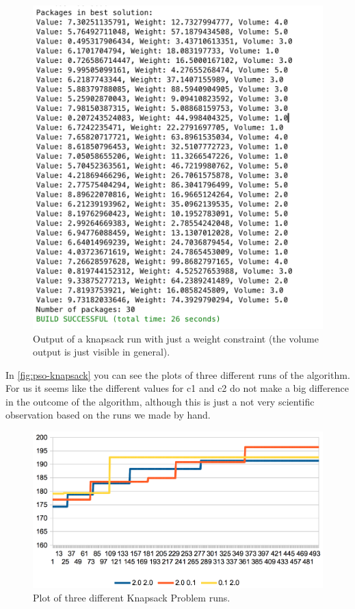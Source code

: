 \documentclass{scrartcl}
\begin{document}
\begin{figure}[!htbp]
 \includegraphics[width=1.0\linewidth]{graphics/simple-knapsack-output.png}
\caption{Output of a knapsack run with just a weight constraint (the volume output is just visible in general).}\label{fig:simple-knapsack-output}
 \end{figure}

In \autoref{fig:pso-knapsack} you can see the plots of three different runs of the algorithm. For us it seems like the different values for c1 and c2 do not make a big difference in the outcome of the algorithm, although this is just a not very scientific observation based on the runs we made by hand.

 \begin{figure}[!htbp]
 \includegraphics[width=1.0\linewidth]{graphics/pso-knapsack.png}
\caption{Plot of three different Knapsack Problem runs.}\label{fig:pso-knapsack}
 \end{figure}
\end{document}
